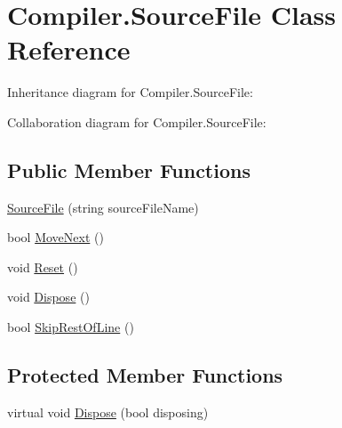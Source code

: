 \hypertarget{class_compiler_1_1_source_file}{}\section{Compiler.\+Source\+File Class Reference}
\label{class_compiler_1_1_source_file}


Inheritance diagram for Compiler.\+Source\+File\+:


Collaboration diagram for Compiler.\+Source\+File\+:
\subsection*{Public Member Functions}
\begin{DoxyCompactItemize}
\item 
\mbox{\hyperlink{class_compiler_1_1_source_file_aba8bb7d1c0418d2b0c6033308209265a}{Source\+File}} (string source\+File\+Name)
\item 
bool \mbox{\hyperlink{class_compiler_1_1_source_file_ad80d0f3a9ead18dce6baad58971838bb}{Move\+Next}} ()
\item 
void \mbox{\hyperlink{class_compiler_1_1_source_file_aa64348e54dbb048b3ec58ce3d355e014}{Reset}} ()
\item 
void \mbox{\hyperlink{class_compiler_1_1_source_file_af5331d15e3c1a629af9cbd273c36c02c}{Dispose}} ()
\item 
bool \mbox{\hyperlink{class_compiler_1_1_source_file_a236483cd300f9793eed183d32959c7bd}{Skip\+Rest\+Of\+Line}} ()
\end{DoxyCompactItemize}
\subsection*{Protected Member Functions}
\begin{DoxyCompactItemize}
\item 
virtual void \mbox{\hyperlink{class_compiler_1_1_source_file_a71c994b257804a95d0f05f7347b10879}{Dispose}} (bool disposing)
\end{DoxyCompactItemize}
